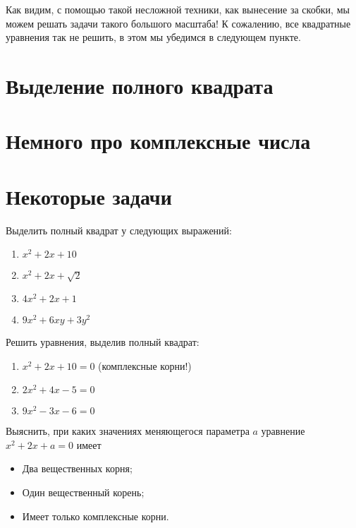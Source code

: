 \documentclass[11pt,fleqn]{book} %
\begin{document}
Как видим, с помощью такой несложной техники, как вынесение за скобки, мы можем решать задачи такого большого масштаба! К сожалению, все квадратные уравнения так не решить, в этом мы убедимся в следующем пункте.

\section{Выделение полного квадрата}


\section{Немного про комплексные числа}


\section{Некоторые задачи}

\begin{problem}
Выделить полный квадрат у следующих выражений:
\begin{enumerate}
\item $x^2 + 2x + 10$
\item $x^2 + 2x + \sqrt 2$
\item $4x^2 + 2x + 1$
\item $9x^2 + 6xy + 3y^2$
\end{enumerate}
\end{problem}

\begin{problem}
Решить уравнения, выделив полный квадрат:
\begin{enumerate}
\item $x^2 + 2x + 10 = 0$ (комплексные корни!)
\item $2x^2 + 4x - 5 = 0$
\item $9x^2 - 3x - 6 = 0$
\end{enumerate}
\end{problem}

\begin{problem}
Выяснить, при каких значениях меняющегося параметра $a$ уравнение
$x^2 + 2x + a = 0$ имеет
\begin{itemize}
\item Два вещественных корня;
\item Один вещественный корень;
\item Имеет только комплексные корни.
\end{itemize}
\end{problem}
\end{document}
